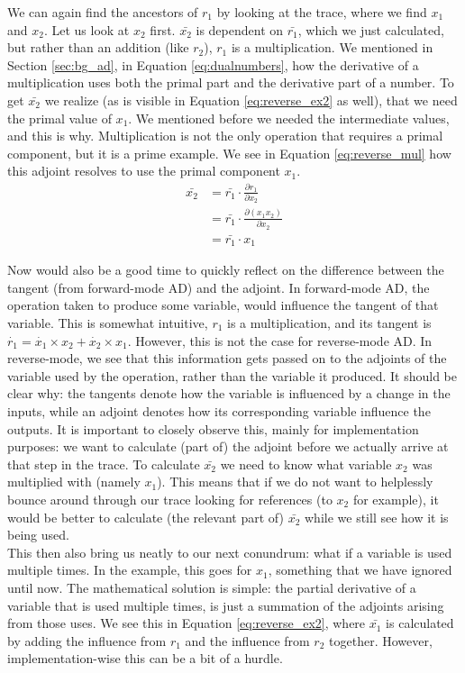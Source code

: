     We can again find the ancestors of $r_1$ by looking at the trace, where we find $x_1$ and $x_2$.
    Let us look at $x_2$ first.
    $\bar{x_2}$ is dependent on $\bar{r_1}$, which we just calculated, but rather than an addition (like $r_2$), $r_1$ is a multiplication.
    We mentioned in Section \ref{sec:bg_ad}, in Equation \ref{eq:dualnumbers}, how the derivative of a multiplication uses both the primal part and the derivative part of a number.
    To get $\bar{x_2}$ we realize (as is visible in Equation \ref{eq:reverse_ex2} as well), that we need the primal value of $x_1$.
    We mentioned before we needed the intermediate values, and this is why.
    Multiplication is not the only operation that requires a primal component, but it is a prime example.
    We see in Equation \ref{eq:reverse_mul} how this adjoint resolves to use the primal component $x_1$.
    \begin{equation} \label{eq:reverse_mul}
        \begin{aligned}
            \bar{x_2}&=\bar{r_1}\cdot\frac{\partial r_1}{\partial x_2}\\
            &=\bar{r_1}\cdot\frac{\partial(x_1x_2)}{\partial x_2}\\
            &=\bar{r_1}\cdot x_1
        \end{aligned}
    \end{equation}

    Now would also be a good time to quickly reflect on the difference between the tangent (from forward-mode AD) and the adjoint.
    In forward-mode AD, the operation taken to produce some variable, would influence the tangent of that variable.
    This is somewhat intuitive, $r_1$ is a multiplication, and its tangent is $\dot{r_1}=\dot{x_1}\times x_2+\dot{x_2}\times x_1$.
    However, this is not the case for reverse-mode AD.
    In reverse-mode, we see that this information gets passed on to the adjoints of the variable used by the operation, rather than the variable it produced.
    It should be clear why: the tangents denote how the variable is influenced by a change in the inputs, while an adjoint denotes how its corresponding variable influence the outputs.
    It is important to closely observe this, mainly for implementation purposes: we want to calculate (part of) the adjoint before we actually arrive at that step in the trace.
    To calculate $\bar{x_2}$ we need to know what variable $x_2$ was multiplied with (namely $x_1$).
    This means that if we do not want to helplessly bounce around through our trace looking for references (to $x_2$ for example), it would be better to calculate (the relevant part of) $\bar{x_2}$ while we still see how it is being used.\\
    This then also bring us neatly to our next conundrum: what if a variable is used multiple times.
    In the example, this goes for $x_1$, something that we have ignored until now.
    The mathematical solution is simple: the partial derivative of a variable that is used multiple times, is just a summation of the adjoints arising from those uses.
    We see this in Equation \ref{eq:reverse_ex2}, where $\bar{x_1}$ is calculated by adding the influence from $r_1$ and the influence from $r_2$ together.
    However, implementation-wise this can be a bit of a hurdle.


